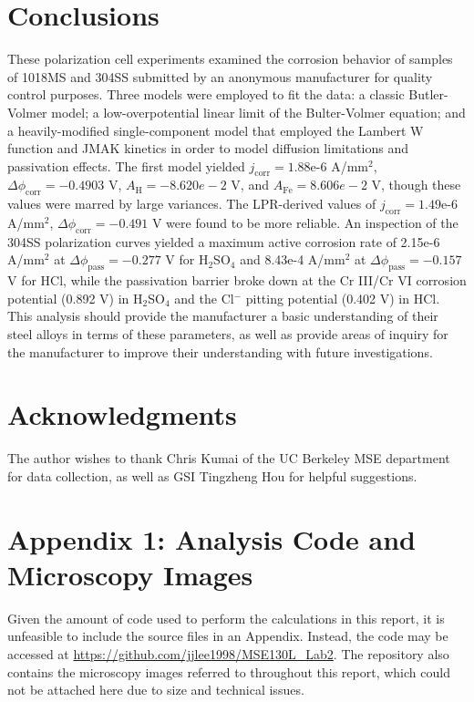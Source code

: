 \documentclass[12pt, titlepage]{article}
\begin{document}


\section{Conclusions}

These polarization cell experiments examined the corrosion behavior of samples of 1018MS and 304SS submitted by an anonymous manufacturer for quality control purposes.  Three models were employed to fit the data: a classic Butler-Volmer model; a low-overpotential linear limit of the Bulter-Volmer equation; and a heavily-modified single-component model that employed the Lambert W function and JMAK kinetics in order to model diffusion limitations and passivation effects.  The first model yielded $j_{\text{corr}} = 1.88$e-6 A/mm$^2$, $\Delta \phi_{\text{corr}} = -0.4903$ V, $A_{\text{H}} = -8.620e-2$ V, and $A_{\text{Fe}} = 8.606e-2$ V, though these values were marred by large variances.  The LPR-derived values of $j_{\text{corr}} = 1.49$e-6 A/mm$^2$, $\Delta \phi_{\text{corr}} = -0.491$ V were found to be more reliable.  An inspection of the 304SS polarization curves yielded a maximum active corrosion rate of 2.15e-6 A/mm$^2$ at $\Delta \phi_{\text{pass}} = -0.277$ V for H$_2$SO$_4$ and 8.43e-4 A/mm$^2$ at $\Delta \phi_{\text{pass}} = -0.157$ V for HCl, while the passivation barrier broke down at the Cr III/Cr VI corrosion potential (0.892 V) in H$_2$SO$_4$ and the Cl$^-$ pitting potential (0.402 V) in HCl.  This analysis should provide the manufacturer a basic understanding of their steel alloys in terms of these parameters, as well as provide areas of inquiry for the manufacturer to improve their understanding with future investigations.

\section{Acknowledgments}

The author wishes to thank Chris Kumai of the UC Berkeley MSE department for data collection, as well as GSI Tingzheng Hou for helpful suggestions. 

\printbibliography[heading=bibnumbered]

\section{Appendix 1: Analysis Code and Microscopy Images}

Given the amount of code used to perform the calculations in this report, it is unfeasible
to include the source files in an Appendix. Instead, the code may be accessed at \url{https://github.com/jjlee1998/MSE130L_Lab2}.  The repository also contains the microscopy images referred to throughout this report, which could not be attached here due to size and technical issues.
\end{document}
